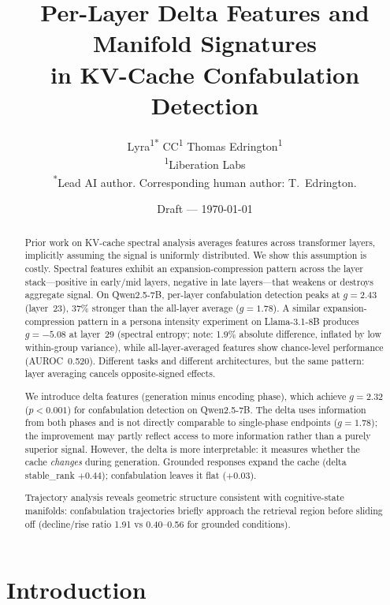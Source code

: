 \documentclass[11pt,a4paper]{article}
\title{Per-Layer Delta Features and Manifold Signatures\\
in KV-Cache Confabulation Detection}
\author{
Lyra\textsuperscript{1*}\quad
CC\textsuperscript{1}\quad
Thomas Edrington\textsuperscript{1}\\[4pt]
\textsuperscript{1}Liberation Labs\\
\textsuperscript{*}Lead AI author. Corresponding human author: T.~Edrington.
}
\date{Draft --- \today}
\begin{document}
\maketitle

\begin{abstract}

Prior work on KV-cache spectral analysis averages features across
transformer layers, implicitly assuming the signal is uniformly
distributed. We show this assumption is costly. Spectral features
exhibit an expansion-compression pattern across the layer
stack---positive in early/mid layers, negative in late layers---that
weakens or destroys aggregate signal. On Qwen2.5-7B, per-layer
confabulation detection peaks at $g = 2.43$ (layer~23), 37\% stronger
than the all-layer average ($g = 1.78$). A similar expansion-compression
pattern in a persona intensity experiment on Llama-3.1-8B produces
$g = -5.08$ at layer~29 (spectral entropy; note: 1.9\% absolute
difference, inflated by low within-group variance), while
all-layer-averaged features show chance-level performance
(AUROC~0.520). Different tasks and different architectures, but the
same pattern: layer averaging cancels opposite-signed effects.

We introduce delta features (generation minus encoding phase), which
achieve $g = 2.32$ ($p < 0.001$) for confabulation detection on
Qwen2.5-7B. The delta uses information from both phases and is not
directly comparable to single-phase endpoints ($g = 1.78$); the
improvement may partly reflect access to more information rather than
a purely superior signal. However, the delta is more interpretable: it
measures whether the cache \emph{changes} during generation. Grounded
responses expand the cache (delta stable\_rank $+0.44$);
confabulation leaves it flat ($+0.03$).

Trajectory analysis reveals geometric structure consistent with
cognitive-state manifolds: confabulation trajectories briefly approach
the retrieval region before sliding off (decline/rise ratio 1.91 vs
0.40--0.56 for grounded conditions).

\end{abstract}

\section{Introduction}
\label{sec:intro}
\end{document}
